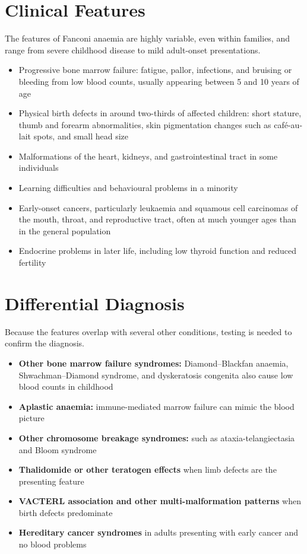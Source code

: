 \section*{Clinical Features}
The features of Fanconi anaemia are highly variable, even within families, and range from severe childhood disease to mild adult-onset presentations.
\begin{itemize}
    \item Progressive bone marrow failure: fatigue, pallor, infections, and bruising or bleeding from low blood counts, usually appearing between 5 and 10 years of age
    \item Physical birth defects in around two-thirds of affected children: short stature, thumb and forearm abnormalities, skin pigmentation changes such as café-au-lait spots, and small head size
    \item Malformations of the heart, kidneys, and gastrointestinal tract in some individuals
    \item Learning difficulties and behavioural problems in a minority
    \item Early-onset cancers, particularly leukaemia and squamous cell carcinomas of the mouth, throat, and reproductive tract, often at much younger ages than in the general population
    \item Endocrine problems in later life, including low thyroid function and reduced fertility
\end{itemize}

\section*{Differential Diagnosis}
Because the features overlap with several other conditions, testing is needed to confirm the diagnosis.
\begin{itemize}
    \item \textbf{Other bone marrow failure syndromes:} Diamond--Blackfan anaemia, Shwachman--Diamond syndrome, and dyskeratosis congenita also cause low blood counts in childhood
    \item \textbf{Aplastic anaemia:} immune-mediated marrow failure can mimic the blood picture
    \item \textbf{Other chromosome breakage syndromes:} such as ataxia-telangiectasia and Bloom syndrome
    \item \textbf{Thalidomide or other teratogen effects} when limb defects are the presenting feature
    \item \textbf{VACTERL association and other multi-malformation patterns} when birth defects predominate
    \item \textbf{Hereditary cancer syndromes} in adults presenting with early cancer and no blood problems
\end{itemize}

